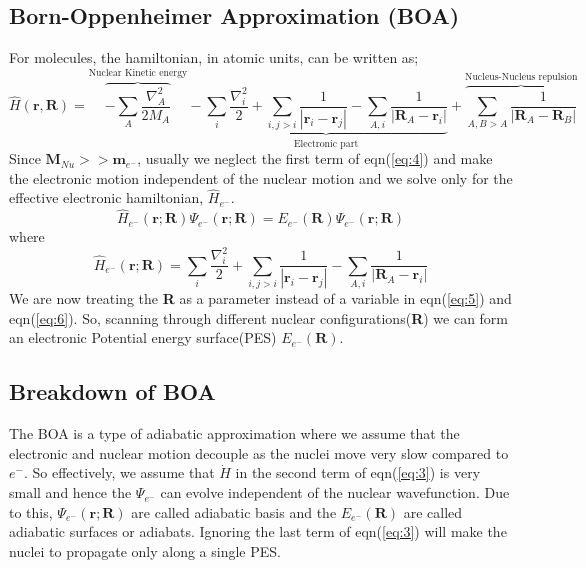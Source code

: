 \documentclass[12pt]{article}
\begin{document}
\subsection{Born-Oppenheimer Approximation (BOA)}
For molecules, the hamiltonian, in atomic units, can be written as;
\begin{equation}\label{eq:4}
\hat{H}(\textbf{r},\textbf{R}) 
= 
\overbrace{-\sum_A\frac{\nabla_A^2}{2M_A}}^\text{Nuclear Kinetic energy}
-
\underbrace{\sum_i\frac{\nabla_i^2}{2}+\sum_{i,j>i}\frac{1}{|\textbf{r}_i-\textbf{r}_j|} -\sum_{A,i}\frac{1}{|\textbf{R}_A-\textbf{r}_i|}}_\text{Electronic part} 
+
\overbrace{\sum_{A,B>A}\frac{1}{|\textbf{R}_A-\textbf{R}_B|}}^\text{Nucleus-Nucleus repulsion}
\end{equation}
Since $\textbf{M}_{Nu} >> \textbf{m}_{e^-}$, usually we neglect the first term of eqn(\ref{eq:4}) and make the electronic motion independent of the nuclear motion and we solve only for the effective electronic hamiltonian, $\hat{H}_{e^-}$.
\begin{equation}\label{eq:5}
\hat{H}_{e^-}(\textbf{r};\textbf{R})\Psi_{e^-}(\textbf{r};\textbf{R}) = E_{e^-}(\textbf{R})\Psi_{e^-}(\textbf{r};\textbf{R})
\end{equation} 
where
\begin{equation}\label{eq:6}
\hat{H}_{e^-}(\textbf{r};\textbf{R}) = \sum_i\frac{\nabla_i^2}{2}+\sum_{i,j>i}\frac{1}{|\textbf{r}_i-\textbf{r}_j|} -\sum_{A,i}\frac{1}{|\textbf{R}_A-\textbf{r}_i|}
\end{equation}
We are now treating the \textbf{R} as a parameter instead of a variable in eqn(\ref{eq:5}) and eqn(\ref{eq:6}). So, scanning through different nuclear configurations(\textbf{R}) we can form an electronic Potential energy surface(PES) $E_{e^-}(\textbf{R})$.

\subsection{Breakdown of BOA}
The BOA is a type of adiabatic approximation where we assume that the electronic and nuclear motion decouple as the nuclei move very slow compared to $e^-$. So effectively, we assume that $\dot{H}$ in the second term of eqn(\ref{eq:3}) is very small and hence the $\Psi_{e^-}$ can evolve independent of the nuclear wavefunction. Due to this, 
$\Psi_{e^-}(\textbf{r};\textbf{R})$ are called adiabatic basis and the $E_{e^-}(\textbf{R})$ are called adiabatic surfaces or adiabats. Ignoring the last term of eqn(\ref{eq:3}) will make the nuclei to propagate only along a single PES.
\vspace{2mm}
\end{document}
